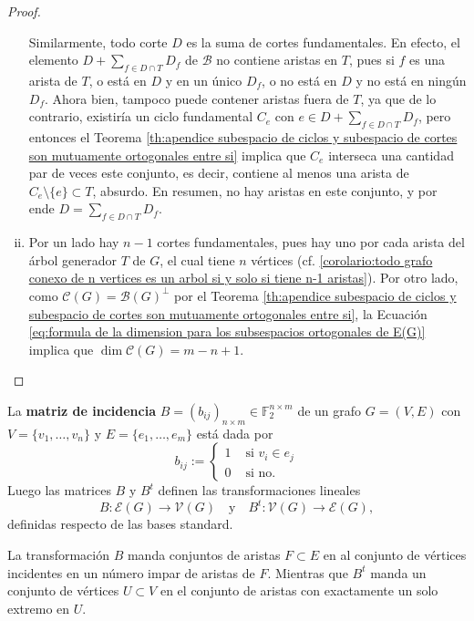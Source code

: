 \documentclass[../main.tex]{subfiles}
\begin{document}
\begin{proof}
\begin{enumerate}[(i)]
Similarmente, todo corte $D$ es la suma de cortes fundamentales. En efecto, el elemento $D + \sum_{f \in D \cap T} D_f$ de $\mathcal B$ no contiene aristas en $T$, pues si $f$ es una arista de $T$, o está en $D$ y en un único $D_f$, o no está en $D$ y no está en ningún $D_f$. Ahora bien, tampoco puede contener aristas fuera de $T$, ya que de lo contrario, existiría un ciclo fundamental $C_e$ con $e \in D + \sum_{f \in D \cap T} D_f$, pero entonces el Teorema \ref{th:apendice subespacio de ciclos y subespacio de cortes son mutuamente ortogonales entre si} implica que $C_e$ interseca una cantidad par de veces este conjunto, es decir, contiene al menos una arista de $C_e \setminus \{ e\} \subset T$, absurdo. En resumen, no hay aristas en este conjunto, y por ende $D = \sum_{f \in D \cap T} D_f$.
\item Por un lado hay $n-1$ cortes fundamentales, pues hay uno por cada arista del árbol generador $T$ de $G$, el cual tiene $n$ vértices (cf. \ref{corolario:todo grafo conexo de n vertices es un arbol si y solo si tiene n-1 aristas}). Por otro lado, como $\mathcal C (G) = \mathcal B (G)^\perp$ por el Teorema \ref{th:apendice subespacio de ciclos y subespacio de cortes son mutuamente ortogonales entre si}, la Ecuación \eqref{eq:formula de la dimension para los subsespacios ortogonales de E(G)} implica que $\dim \mathcal C (G) = m-n+1$.
\end{enumerate}
\end{proof}


\begin{definition}
    La \textbf{matriz de incidencia} $B = (b_{ij})_{n \times m} \in \mathbb{F}_2^{n\times m}$ de un grafo $G = (V,E)$
    con $V = \{ v_1
    ,\ldots, v_n\}$ y $E = \{e_1,\ldots,e_m\}$ está dada por
    \[
        b_{ij} := \begin{cases}
                    1 & \text{ si $v_i \in e_j$}\\
                    0 & \text{ si no.}
                    \end{cases}
    \]
    Luego las matrices $B$ y $B^t$ definen las transformaciones lineales
    \[
        B : \mathcal E (G) \rightarrow \mathcal V (G) \quad \text{y} \quad B^t : \mathcal V (G) \rightarrow \mathcal E (G),
    \]
    definidas respecto de las bases standard.
\end{definition}

\begin{obs}
La transformación $B$ manda conjuntos de aristas $F \subset E$ en al conjunto de vértices incidentes en un número
impar de aristas de $F$. Mientras que $B^t$ manda un conjunto de vértices $U \subset V$ en el conjunto de aristas
con exactamente un solo extremo en $U$.
\end{obs}
\end{document}
